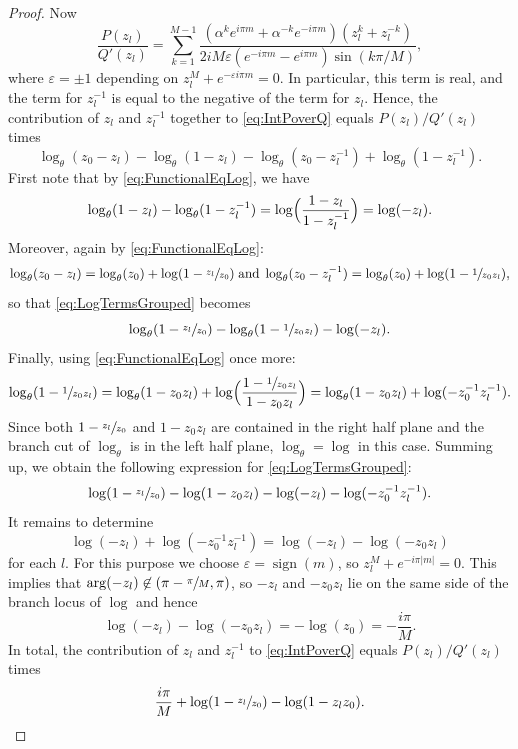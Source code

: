 \documentclass[10pt]{amsart}
\theoremstyle{plain}
\theoremstyle{definition}
\theoremstyle{remark}
\DeclareMathOperator{\sign}{sign}
\numberwithin{equation}{section}
\begin{document}
\begin{proof}
Now
\[
\frac{P(z_l)}{Q'(z_l)} = \sum_{k=1}^{M-1} \frac {(\alpha^k e^{i\pi m} + \alpha^{-k}e^{-i\pi m})(z_l^k+z_l^{-k})}{2iM \varepsilon (e^{-i\pi m}-e^{i\pi m}) \sin(k\pi/M)},
\]
where $\varepsilon = \pm 1$ depending on $z_l^M + e^{-\varepsilon i\pi m}=0$. In particular, this term is real, and the term for $z_l^{-1}$ is equal to the negative of the term for $z_l$. Hence, the contribution of $z_l$ and $z_l^{-1}$ together to \cref{eq:IntPoverQ} equals $P(z_l)/Q'(z_l)$ times
\begin{equation}
\log\nolimits_\theta(z_0-z_l)-\log\nolimits_\theta(1-z_l)-\log\nolimits_\theta(z_0-z_l^{-1})+\log\nolimits_\theta(1-z_l^{-1}).\label{eq:LogTermsGrouped}
\end{equation}
First note that by \cref{eq:FunctionalEqLog}, we have
\[
\log\nolimits_\theta(1-z_l)-\log\nolimits_\theta(1-z_l^{-1}) = \log\Bigl(\frac{1-z_l}{1-z_l^{-1}}\Bigr) = \log(-z_l).
\]
Moreover, again by \cref{eq:FunctionalEqLog}:
\[
\log\nolimits_\theta(z_0-z_l) = \log\nolimits_\theta(z_0) + \log(1-\sfrac{z_l}{z_0}) \; \text{and} \; \log\nolimits_\theta(z_0-z_l^{-1}) = \log\nolimits_\theta(z_0) + \log(1-\sfrac{1}{z_0z_l}),
\]
so that \cref{eq:LogTermsGrouped} becomes
\[
\log\nolimits_\theta(1-\sfrac{z_l}{z_0})-\log\nolimits_\theta(1-\sfrac{1}{z_0z_l})-\log(-z_l).
\]
Finally, using \cref{eq:FunctionalEqLog} once more:
\[
\log\nolimits_\theta(1-\sfrac{1}{z_0z_l}) = \log\nolimits_\theta(1-z_0z_l) + \log\Bigl(\frac{1-\sfrac{1}{z_0z_l}}{1-z_0z_l}\Bigr) = \log\nolimits_\theta(1-z_0z_l) + \log(-z_0^{-1}z_l^{-1}).
\]
Since both $1-\sfrac{z_l}{z_0}$ and $1-z_0z_l$ are contained in the right half plane and the branch cut of $\log\nolimits_\theta$ is in the left half plane, $\log\nolimits_\theta=\log$ in this case. Summing up, we obtain the following expression for \cref{eq:LogTermsGrouped}:
\[
\log(1-\sfrac{z_l}{z_0})-\log(1-z_0z_l)-\log(-z_l)-\log(-z_0^{-1}z_l^{-1}).
\]
It remains to determine
\[
\log(-z_l)+\log(-z_0^{-1}z_l^{-1}) = \log(-z_l)-\log(-z_0z_l)
\]
for each $l$. For this purpose we choose $\varepsilon=\sign(m)$, so $z_l^M+e^{-i\pi|m|}=0$. This implies that $\arg(-z_l)\not\in(\pi-\sfrac{\pi}{M},\pi)$, so $-z_l$ and $-z_0z_l$ lie on the same side of the branch locus of $\log$ and hence
\[
\log(-z_l)-\log(-z_0z_l) = -\log(z_0) = -\frac{i\pi}{M}.
\]
In total, the contribution of $z_l$ and $z_l^{-1}$ to \cref{eq:IntPoverQ} equals $P(z_l)/Q'(z_l)$ times
\begin{equation}
\frac {i\pi}{M} + \log(1-\sfrac {z_l}{z_0}) - \log(1-z_l z_0).\label{eq:LogRearrangement}
\end{equation}


\end{proof}
\end{document}
